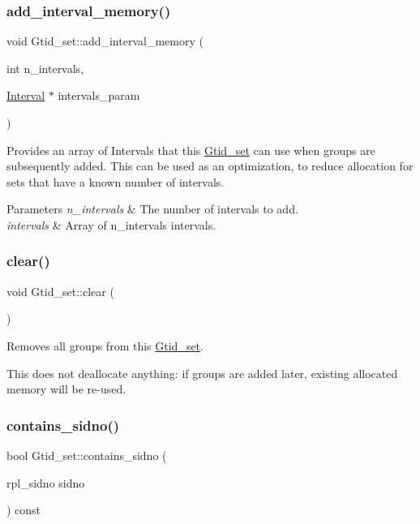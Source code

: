 \subsubsection{\texorpdfstring{add\+\_\+interval\+\_\+memory()}{add\_interval\_memory()}}
{\footnotesize\ttfamily void Gtid\+\_\+set\+::add\+\_\+interval\+\_\+memory (\begin{DoxyParamCaption}\item[{int}]{n\+\_\+intervals,  }\item[{\mbox{\hyperlink{structGtid__set_1_1Interval}{Interval}} $\ast$}]{intervals\+\_\+param }\end{DoxyParamCaption})\hspace{0.3cm}{\ttfamily [inline]}}

Provides an array of Intervals that this \mbox{\hyperlink{classGtid__set}{Gtid\+\_\+set}} can use when groups are subsequently added. This can be used as an optimization, to reduce allocation for sets that have a known number of intervals.


\begin{DoxyParams}{Parameters}
{\em n\+\_\+intervals} & The number of intervals to add. \\
\hline
{\em intervals} & Array of n\+\_\+intervals intervals. \\
\hline
\end{DoxyParams}
\mbox{\label{classGtid__set_a8d8130a7559cfd7b940f42e66c9b171a}} 
\subsubsection{\texorpdfstring{clear()}{clear()}}
{\footnotesize\ttfamily void Gtid\+\_\+set\+::clear (\begin{DoxyParamCaption}{ }\end{DoxyParamCaption})}

Removes all groups from this \mbox{\hyperlink{classGtid__set}{Gtid\+\_\+set}}.

This does not deallocate anything\+: if groups are added later, existing allocated memory will be re-\/used. \mbox{\label{classGtid__set_a129894d15720c07d707ca29a426cbe47}} 
\subsubsection{\texorpdfstring{contains\+\_\+sidno()}{contains\_sidno()}}
{\footnotesize\ttfamily bool Gtid\+\_\+set\+::contains\+\_\+sidno (\begin{DoxyParamCaption}\item[{rpl\+\_\+sidno}]{sidno }\end{DoxyParamCaption}) const\hspace{0.3cm}{\ttfamily [inline]}}

